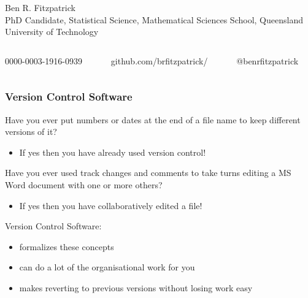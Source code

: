 \documentclass[xcolor=dvipsnames]{beamer}
\begin{document}
\begin{frame}
\begin{figure}
\begin{columns}
\end{columns}
\end{figure}

\small Ben R. Fitzpatrick\\
\tiny PhD Candidate, Statistical Science, Mathematical Sciences School, Queensland University of Technology
\newline
\begin{columns}
\begin{column}{3cm}
\tiny 0000-0003-1916-0939
\end{column}
\begin{column}{3cm}
\tiny github.com/brfitzpatrick/
\end{column}
\begin{column}{3cm}
\tiny @benrfitzpatrick
\end{column}
\end{columns}
\end{frame}


\begin{frame}
\frametitle{Version Control Software}
Have you ever put numbers or dates at the end of a file name to keep different versions of it? 
\begin{itemize} 
\item If yes then you have already used version control!
\newline
\newline
\end{itemize}

Have you ever used track changes and comments to take turns editing a  MS Word document with one or more others?
\begin{itemize}
\item If yes then you have collaboratively edited a file!
\newline
\newline
\end{itemize}

Version Control Software: 
\begin{itemize} 
\item formalizes these concepts
\item can do a lot of the organisational work for you
\item makes reverting to previous versions without losing work easy 
\end{itemize}
 
\end{frame}
\end{document}
